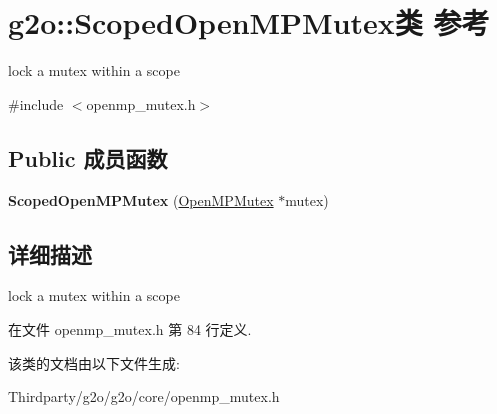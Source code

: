 \hypertarget{classg2o_1_1ScopedOpenMPMutex}{\section{g2o\-:\-:Scoped\-Open\-M\-P\-Mutex类 参考}
\label{classg2o_1_1ScopedOpenMPMutex}
}


lock a mutex within a scope  




{\ttfamily \#include $<$openmp\-\_\-mutex.\-h$>$}

\subsection*{Public 成员函数}
\begin{DoxyCompactItemize}
\item 
\hypertarget{classg2o_1_1ScopedOpenMPMutex_abb18bffae04b138447870b58ab158f56}{{\bfseries Scoped\-Open\-M\-P\-Mutex} (\hyperlink{classg2o_1_1OpenMPMutex}{Open\-M\-P\-Mutex} $\ast$mutex)}\label{classg2o_1_1ScopedOpenMPMutex_abb18bffae04b138447870b58ab158f56}

\end{DoxyCompactItemize}


\subsection{详细描述}
lock a mutex within a scope 

在文件 openmp\-\_\-mutex.\-h 第 84 行定义.



该类的文档由以下文件生成\-:\begin{DoxyCompactItemize}
\item 
Thirdparty/g2o/g2o/core/openmp\-\_\-mutex.\-h\end{DoxyCompactItemize}
